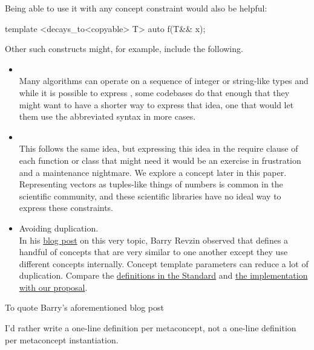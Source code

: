 \documentclass{wg21}
\begin{document}
Being able to use it with any concept constraint would also be helpful:

\begin{colorblock}
template <decays_to<copyable> T>
auto f(T&& x);
\end{colorblock}


Other such constructs might, for example, include the following.
\begin{itemize}
\item {}\\
    Many algorithms can operate on a sequence of integer or string-like types and while it is possible to express
    , some codebases do that enough that they might want to have a shorter way to express that idea,
    one that would let them use the abbreviated syntax in more cases.

\item {} \\
    This follows the same idea, but expressing this idea in the require clause of each function or class that might need it would be an exercise in frustration and a maintenance nightmare. We explore a  concept later in this paper.
    Representing vectors as tuples-like things of numbers is common in the scientific community, and these scientific libraries have no ideal way to express these constraints.

\item Avoiding duplication.\\
    In his \href{https://brevzin.github.io/c++/2019/01/09/concept-templates/}{blog post} on this very topic, Barry Revzin observed that  defines a handful of concepts that are very
    similar to one another except they use different concepts internally. Concept template parameters can reduce a lot of duplication.
    Compare the \href{https://eel.is/c++draft/indirectcallable.indirectinvocable}{definitions in the Standard} and \href{https://godbolt.org/z/ohKsoKh9G}{the implementation with our proposal}.
\end{itemize}

To quote Barry's aforementioned blog post

\begin{quoteblock}
I’d rather write a one-line definition per metaconcept, not a one-line definition per metaconcept instantiation.
\end{quoteblock}
\end{document}
